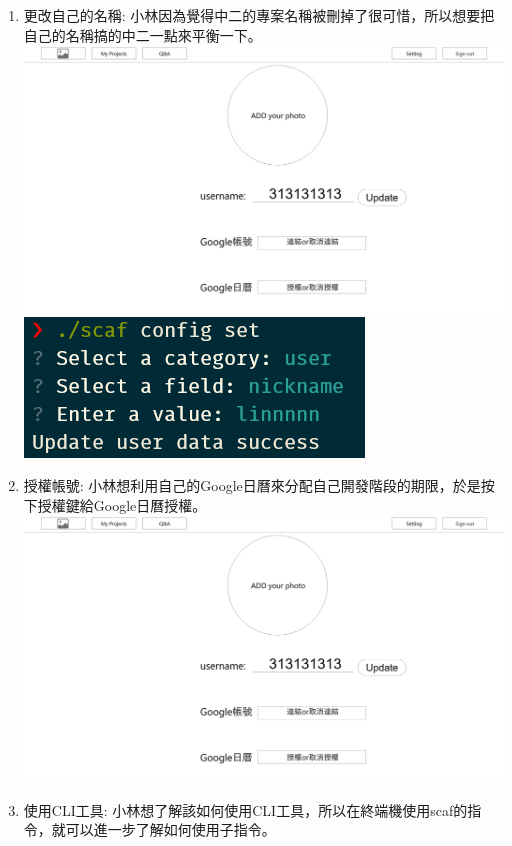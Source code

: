 \documentclass{report}
\begin{document}
\begin{enumerate}[label=(\Alph*)]
  \item 更改自己的名稱: 小林因為覺得中二的專案名稱被刪掉了很可惜，所以想要把自己的名稱搞的中二一點來平衡一下。\\
  \includegraphics[width=\textwidth]{assets/wireframe/setting.png}
  \includegraphics[width=\textwidth]{assets/wireframe/setting_name_CLI.png}
  \item 授權帳號: 小林想利用自己的Google日曆來分配自己開發階段的期限，於是按下授權鍵給Google日曆授權。\\
  \includegraphics[width=\textwidth]{assets/wireframe/setting.png}
  \item 使用CLI工具: 小林想了解該如何使用CLI工具，所以在終端機使用scaf的指令，就可以進一步了解如何使用子指令。\\

\end{enumerate}
\end{document}
